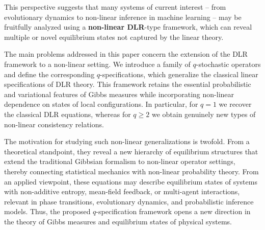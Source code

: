 \documentclass[11pt,reqno]{amsart}
\numberwithin{equation}{section} \setcounter{tocdepth}{1}
\begin{document}
This perspective suggests that many systems of current interest -- from evolutionary dynamics to non-linear 
inference in machine learning -- may be fruitfully analyzed using a \textbf{non-linear DLR}-type framework, 
which can reveal multiple or novel equilibrium states not captured by the linear theory.

The main problems addressed in this paper concern the extension of the DLR framework to a non-linear setting. 
We introduce a family of $q$-stochastic operators and define the corresponding $q$-specifications, which generalize the classical linear specifications of DLR theory. 
This framework retains the essential probabilistic and variational features of Gibbs measures while incorporating non-linear dependence on states of local configurations. 
In particular, for $q=1$ we recover the classical DLR equations, whereas for $q\ge 2$ we obtain genuinely new types of non-linear consistency relations.

The motivation for studying such non-linear generalizations is twofold. 
From a theoretical standpoint, they reveal a new hierarchy of 
equilibrium structures that extend the traditional Gibbsian formalism to non-linear operator settings, thereby connecting statistical mechanics with non-linear probability theory. 
From an applied viewpoint, these equations may describe equilibrium states of systems with non-additive entropy, mean-field feedback, or multi-agent interactions, 
relevant in phase transitions, evolutionary dynamics, and probabilistic inference models. 
Thus, the proposed $q$-specification framework opens a new direction in the theory of Gibbs measures and equilibrium states of physical systems.\\
\end{document}
